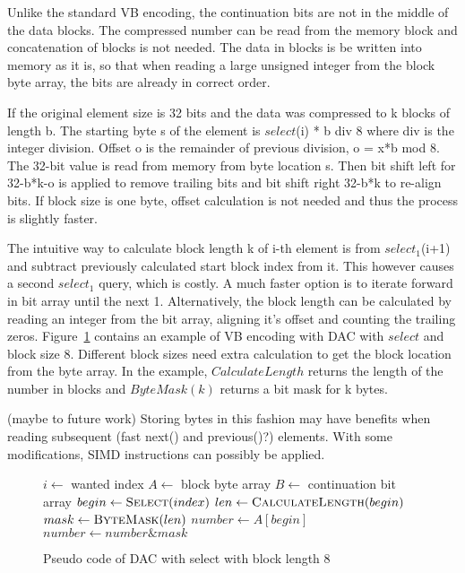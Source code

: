 Unlike the standard VB encoding, the continuation bits are not in the middle of the data blocks. The compressed number can be read from the memory block and concatenation of blocks
is not needed. The data in blocks is be written into memory as it is, so that when reading a large unsigned integer from the block byte array, the bits are already in correct order. 

If the original element size is 32 bits and the data was compressed to k blocks of length b. The starting byte s of the element is $select$(i) * b div 8 where div is the integer division. 
Offset o is the remainder of previous division, o = x*b mod 8. The 32-bit value is read from memory from byte location s. Then bit shift left for 32-b*k-o is applied to remove trailing 
bits and bit shift right 32-b*k to re-align bits. If block size is one byte, offset calculation is not needed and thus the process is slightly faster.

The intuitive way to calculate block length k of i-th element is from $select_1$(i+1) and subtract previously calculated start block index from it. This however causes a second 
$select_1$ query, which is costly. A much faster option is to iterate forward in bit array until the next 1. Alternatively, the block length can be calculated by reading an integer 
from the bit array, aligning it's offset and counting the trailing zeros. Figure~\ref{select_pseudo} contains an example of VB encoding with DAC with $select$ and block size 8. 
Different block sizes need extra calculation to get the block location from the byte array. In the example, $CalculateLength$ returns the length of the number in blocks and $ByteMask(k)$ returns 
a bit mask for k bytes. 

(maybe to future work) Storing bytes in this fashion may have benefits when reading subsequent (fast next() and previous()?) elements. With some modifications, SIMD instructions can possibly be applied.

\begin{figure}[ht]
\begin{algorithmic}
\State $i \gets $ wanted index
\State $A \gets $ block byte array
\State $B \gets $ continuation bit array
\State $begin \gets \Call{Select}{index}$
\State $len \gets \Call{CalculateLength}{begin}$
\State $mask \gets \Call{ByteMask}{len}$
\State $number \gets A[begin]$ 
\State $number \gets number \mathbin{\&} mask$ 


\end{algorithmic}
\caption{Pseudo code of DAC with select with block length 8} \label{select_pseudo}
\end{figure}

